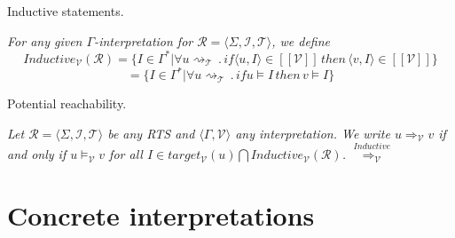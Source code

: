 \begin{definition}\label{definition:inductive_statements}
    Inductive statements.
\end{definition}
\textit{
   For any given $\Gamma$-\textit{interpretation} for $\mathcal{R} = \langle \Sigma, \mathcal{I}, \mathcal{T} \rangle$, we define
   \[
   Inductive_{\mathcal{V}}(\mathcal{R}) = \lbrace I \in \Gamma^* | 
   \forall u \rightsquigarrow_\mathcal{T} \, . \, if \langle u, I \rangle
   \in [[\mathcal{V}]] \, then \, \langle v, I \rangle \in [[\mathcal{V}]] \rbrace
   \]
   \[=  \lbrace I \in \Gamma^* | 
   \forall u \rightsquigarrow_\mathcal{T} \, . \, if u \models I
    \, then \, v \models I \rbrace\]
}
\begin{definition}\label{definition:potential_reachability}
    Potential reachability.
\end{definition}
\textit{
   Let $\mathcal{R} = \langle \Sigma, \mathcal{I}, \mathcal{T} \rangle$ be any \textit{RTS}
   and $\langle \Gamma, \mathcal{V} \rangle$ any interpretation.
   We write $u \Rightarrow_{\mathcal{V}} v$ if and only if $u \models_{\mathcal{V}} v$
   for all $I \in target_\mathcal{V}(u) \bigcap Inductive_\mathcal{V}(\mathcal{R})$.
   }
   $\overset{Inductive}{\Longrightarrow_{\mathcal{V}}}$

   \section{Concrete interpretations}